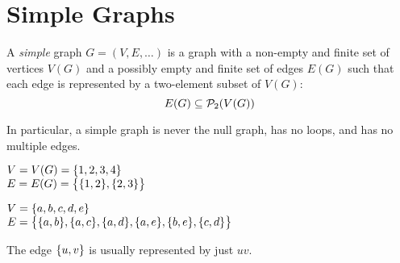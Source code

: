 \documentclass[letterpaper,12pt,fleqn]{article}
\begin{document}
\section*{Simple Graphs}

\begin{definition}
  A \emph{simple} graph \(G=(V,E,\ldots)\) is a graph with a non-empty and finite set of vertices \(V(G)\) and a
  possibly empty and finite set of edges \(E(G)\) such that each edge is represented by a two-element subset of
  \(V(G)\):
  \[E(G)\subseteq\ps_2(V(G))\]
\end{definition}

In particular, a simple graph is never the null graph, has no loops, and has no multiple edges.

\begin{examples}
  \begin{minipage}[t]{2.5in}
    \(V=V(G)=\set*{1,2,3,4}\) \\
    \(E=E(G)=\set[\big]{\set{1,2},\set{2,3}}\)
    
    \bigskip

    \begin{center}
    \end{center}
  \end{minipage}
  \hspace{0.5in}
  \begin{minipage}[t]{3in}
    \(V=\set{a,b,c,d,e}\) \\
    \(E=\set[\big]{\set{a,b},\set{a,c},\set{a,d},\set{a,e},\set{b,e},\set{c,d}}\)
      
    \bigskip
      
    \begin{center}
    \end{center}
  \end{minipage}
\end{examples}

\begin{notation}
  The edge \(\set{u,v}\) is usually represented by just \(uv\).
\end{notation}
\end{document}
